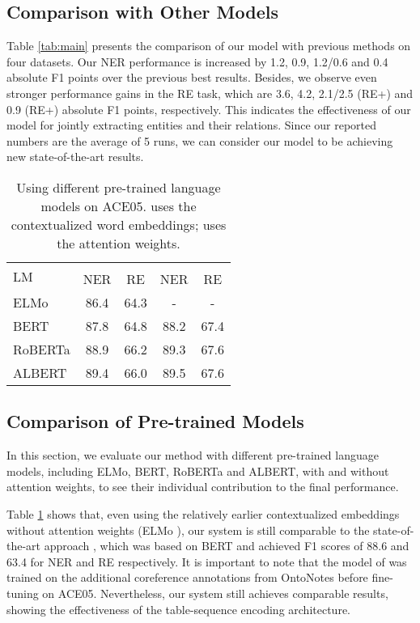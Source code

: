 \documentclass[11pt,a4paper]{article}
\begin{document}
\subsection{Comparison with Other Models}

Table \ref{tab:main} presents the comparison of our model with previous methods on four datasets.
Our NER performance is increased by 1.2, 0.9, 1.2/0.6 and 0.4 absolute F1 points over the previous best results.
Besides, we observe even stronger performance gains in the RE task, which are 3.6, 4.2, 2.1/2.5 (RE{+}) and 0.9 (RE{+}) absolute F1 points, respectively.
This indicates the effectiveness of our model for jointly extracting entities and their relations.
Since our reported numbers are the average of 5 runs, we can consider our model to be achieving new state-of-the-art results.

\begin{table}[t]
\centering
\scalebox{0.82}
{
\begin{tabular}{lcccc}
\toprule
\multirow{2}{*}{LM}
          & \multicolumn{2}{c}{} & \multicolumn{2}{c}{  } \\
          \cmidrule(l{5pt}r{5pt}){2-3} \cmidrule(l{5pt}r{5pt}){4-5}
          &  NER & RE &  NER & RE \\ \midrule
ELMo    & 86.4 & 64.3 & -    & -                  \\
BERT    & 87.8 & 64.8 & 88.2 & 67.4                  \\
RoBERTa & 88.9 & 66.2 & 89.3 & 67.6                  \\
ALBERT  & 89.4 & 66.0 & 89.5 & 67.6                  \\
\bottomrule
\end{tabular}
}
\caption{Using different pre-trained language models on ACE05.
          uses the contextualized word embeddings;
          uses the attention weights.}
\label{tab:lm}
\end{table}

\subsection{Comparison of Pre-trained Models} \label{sec:pretrained}

In this section, we evaluate our method with different pre-trained language models,
including ELMo, BERT, RoBERTa and ALBERT,
with and without attention weights, to see their individual contribution to the final performance.

Table \ref{tab:lm} shows that, even using the relatively earlier contextualized embeddings without attention weights (ELMo ), our system is still comparable to the state-of-the-art approach \cite{wadden2019entity},
which was based on BERT and achieved F1 scores of 88.6 and 63.4 for NER and RE respectively.
It is important to note that the model of \citet{wadden2019entity} was trained on the additional coreference annotations from OntoNotes \cite{weischedel2011ontonotes} before fine-tuning on ACE05.
Nevertheless, our system still achieves comparable results, showing the effectiveness of the table-sequence encoding architecture.
\end{document}
